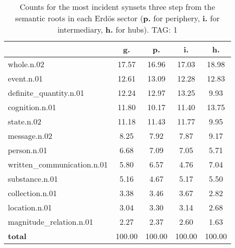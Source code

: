\begin{table}[h!]
\begin{center}
\begin{tabular}{| l || c | c | c | c |}\hline
 & {\bf g.} & {\bf p.} & {\bf i.} & {\bf h.} \\\hline\hline
whole.n.02 & 17.57  & 16.96  & 17.03  & 18.98 \\\hline
event.n.01 & 12.61  & 13.09  & 12.28  & 12.83 \\\hline
definite\_quantity.n.01 & 12.24  & 12.97  & 13.25  & 9.93 \\\hline
cognition.n.01 & 11.80  & 10.17  & 11.40  & 13.75 \\\hline
state.n.02 & 11.18  & 11.43  & 11.77  & 9.95 \\\hline
message.n.02 & 8.25  & 7.92  & 7.87  & 9.17 \\\hline
person.n.01 & 6.68  & 7.09  & 7.05  & 5.71 \\\hline
written\_communication.n.01 & 5.80  & 6.57  & 4.76  & 7.04 \\\hline
substance.n.01 & 5.16  & 4.67  & 5.17  & 5.50 \\\hline
collection.n.01 & 3.38  & 3.46  & 3.67  & 2.82 \\\hline
location.n.01 & 3.04  & 3.30  & 3.14  & 2.68 \\\hline
magnitude\_relation.n.01 & 2.27  & 2.37  & 2.60  & 1.63 \\\hline\hline
{{\bf total}} & 100.00  & 100.00  & 100.00  & 100.00 \\\hline
\end{tabular}
\caption{Counts for the most incident synsets three step from the semantic roots in each Erd\"os sector ({\bf p.} for periphery, {\bf i.} for intermediary, {\bf h.} for hubs). TAG: 1}
\end{center}
\end{table}